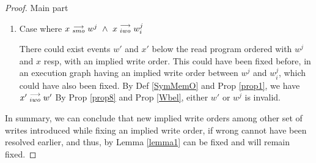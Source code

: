 \begin{proof}{Main part}
\begin{itemize}
\begin{enumerate}
                            \item Case where $x\stackrel{\longrightarrow}{_{smo}}w^j \ \wedge \ x\stackrel{\longrightarrow}{_{iwo}}w_i^j$
                                
                                There could exist events $w'$ and $x'$ below the read program ordered with $w^j$ and $x$ resp, with an implied write order. This could have been fixed before, in an execution graph having an implied write order between $w^j$ and $w_i^j$, which could have also been fixed.
                                By Def \ref{SymMemO} and Prop \ref{prop1}, we have $x'\stackrel{\longrightarrow}{_{iwo}}w'$
                                By Prop \ref{prop8} and Prop \ref{Wbel}, either $w'$ or $w^j$ is invalid.

                        \end{enumerate}
                \end{itemize}

                In summary, we can conclude that new implied write orders among other set of writes introduced while fixing an implied write order, if wrong cannot have been resolved earlier, and thus, by Lemma \ref{lemma1} can be fixed and will remain fixed.

        \end{proof}
